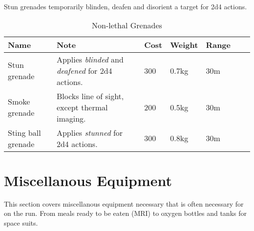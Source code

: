 Stun grenades temporarily blinden, deafen and disorient a target for 2d4
actions.

\begin{table}
  \caption{Non-lethal Grenades}
  \label{tab:NonlethalGrenades}
  \begin{center}
    \begin{tabular}{| l | l | l | l | l | l | l |}

      \hline
      \textbf{Name} & \textbf{Note} & \textbf{Cost} & \textbf{Weight} & \textbf{Range} \\ \hline

      Stun grenade  & Applies \emph{blinded} and \emph{deafened} for 2d4 actions. & 300 & 0.7kg & 30m \\ \hline
      Smoke grenade & Blocks line of sight, except thermal imaging. & 200 & 0.5kg & 30m \\ \hline
      Sting ball grenade & Applies \emph{stunned} for 2d4 actions. & 300 & 0.8kg & 30m \\ \hline

    \end{tabular}
  \end{center}
\end{table}

\section{Miscellanous Equipment}

This section covers miscellanous equipment necessary that is often necessary for
on the run. From meals ready to be eaten (MRI) to oxygen bottles and tanks for
space suits.


